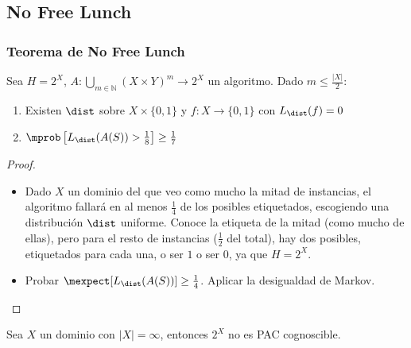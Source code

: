 \subsection{No Free Lunch}
\begin{frame}\frametitle{Teorema de No Free Lunch}
\begin{theorem}
 Sea $H = 2^X$, $A: \underset{m\in \mathbb{N}}{\bigcup} (X\times Y)^m \rightarrow 2^X$ un algoritmo. Dado $m \le \frac{|X|}{2}$:
 \begin{enumerate}[i]
 \item Existen $\dist$ sobre $X\times\{0,1\}$ y $f: X \rightarrow \{0,1\}$ con $L_{\dist}(f)=0$
 \item $\mprob \left[ L_{\dist}(A(S)) > \frac{1}{8} \right] \ge \frac{1}{7}$
 \end{enumerate}
\end{theorem}

\begin{proof}
 \begin{itemize}
  \item Dado $X$ un dominio del que veo como mucho la mitad de instancias, el algoritmo fallará en al menos $\frac{1}{4}$ de los posibles etiquetados,
  escogiendo una distribución $\dist$ uniforme. Conoce la etiqueta de la mitad (como mucho de ellas), pero para el resto de instancias ($\frac{1}{2}$ del total),
  hay dos posibles, etiquetados para cada una, o ser $1$ o ser $0$, ya que $H=2^X$.
  \item Probar $\mexpect [L_{\dist} (A(S))] \ge \frac{1}{4}$. Aplicar la desigualdad de Markov.
 \end{itemize}
\end{proof}

\begin{corollary}
 Sea $X$ un dominio con $|X| = \infty$, entonces $2^X$ no es PAC cognoscible.
\end{corollary}
\end{frame}

